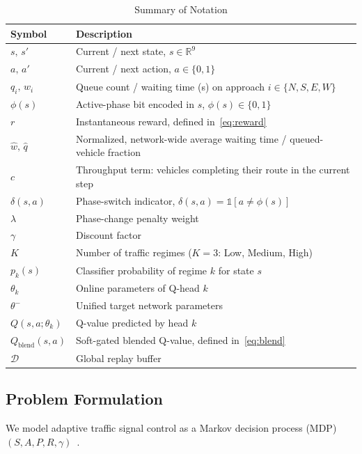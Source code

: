 \documentclass[lettersize,journal]{IEEEtran}
\begin{document}
\begin{table}[!t]
\caption{Summary of Notation\label{tab:notation}}
\centering
\renewcommand{\arraystretch}{1.15}
\begin{tabular}{@{}>{\raggedright}p{1.7cm}
                    >{\raggedright\arraybackslash}p{5.6cm}@{}}
\toprule
\textbf{Symbol} & \textbf{Description} \\
\midrule
$s,\,s'$ & Current / next state, $s\in\mathbb{R}^9$ \\
$a,\,a'$ & Current / next action, $a\in\{0,1\}$ \\
$q_i,\,w_i$ & Queue count / waiting time (s) on approach
             $i\in\{N,S,E,W\}$ \\
$\phi(s)$ & Active-phase bit encoded in $s$, $\phi(s)\in\{0,1\}$ \\
$r$ & Instantaneous reward, defined in~\eqref{eq:reward} \\
$\hat{w},\,\hat{q}$ & Normalized, network-wide average waiting time /
                      queued-vehicle fraction \\
$c$ & Throughput term: vehicles completing their route in the
      current step \\
$\delta(s,a)$ & Phase-switch indicator, $\delta(s,a)=\mathbb{1}[a\neq\phi(s)]$ \\
$\lambda$ & Phase-change penalty weight \\
$\gamma$ & Discount factor \\
$K$ & Number of traffic regimes ($K=3$: Low, Medium, High) \\
$p_k(s)$ & Classifier probability of regime $k$ for state $s$ \\
$\theta_k$ & Online parameters of Q-head $k$ \\
$\theta^{-}$ & Unified target network parameters \\
$Q(s,a;\theta_k)$ & Q-value predicted by head $k$ \\
$Q_{\text{blend}}(s,a)$ & Soft-gated blended Q-value, defined
                          in~\eqref{eq:blend} \\
$\mathcal{D}$ & Global replay buffer \\
\bottomrule
\end{tabular}
\end{table}

\subsection{Problem Formulation}

We model adaptive traffic signal control as a Markov decision process
(MDP) $(S, A, P, R, \gamma)$~\cite{suttonbarto2018}.
\end{document}
